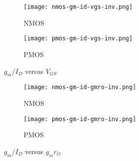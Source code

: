 \documentclass[../main.tex]{subfiles}
\begin{document}
\begin{figure}[H]
    \centering
    \begin{subfigure}{0.5\textwidth}
      \centering
      \texttt{[image: nmos-gm-id-vgs-inv.png]}
      \caption{NMOS}
    \end{subfigure}%
    \begin{subfigure}{0.5\textwidth}
      \centering
      \texttt{[image: pmos-gm-id-vgs-inv.png]}
      \caption{PMOS}
    \end{subfigure}
    \caption{$g_m/I_D$ versus $V_{GS}$}
\end{figure}

\begin{figure}[H]
    \centering
    \begin{subfigure}{0.5\textwidth}
      \centering
      \texttt{[image: nmos-gm-id-gmro-inv.png]}
      \caption{NMOS}
    \end{subfigure}%
    \begin{subfigure}{0.5\textwidth}
      \centering
      \texttt{[image: pmos-gm-id-gmro-inv.png]}
      \caption{PMOS}
    \end{subfigure}
    \caption{$g_m/I_D$ versus $g_m r_O$}
\end{figure}
\end{document}
